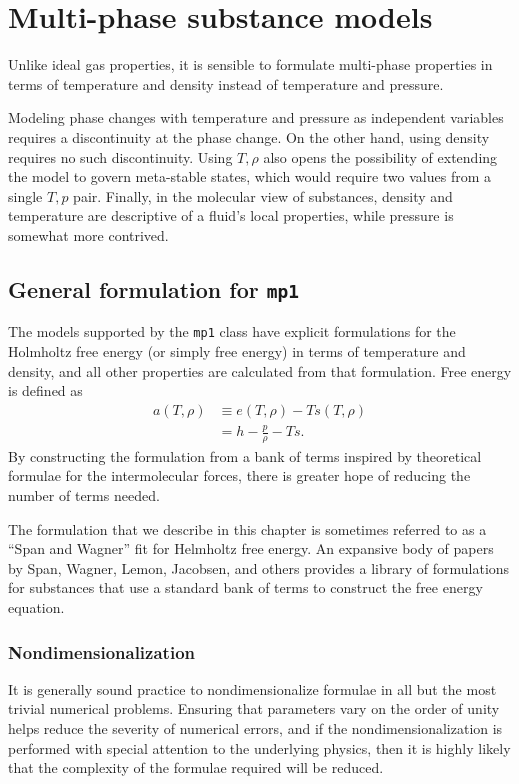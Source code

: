 \chapter{Multi-phase substance models}\label{ch:mp}

Unlike ideal gas properties, it is sensible to formulate multi-phase properties in terms of temperature and density instead of temperature and pressure.  

Modeling phase changes with temperature and pressure as independent variables requires a discontinuity at the phase change.  On the other hand, using density requires no such discontinuity.  Using $T,\rho$ also opens the possibility of extending the model to govern meta-stable states, which would require two values from a single $T,p$ pair.  Finally, in the molecular view of substances, density and temperature are descriptive of a fluid's local properties, while pressure is somewhat more contrived.

\section{General formulation for \texttt{mp1}}\label{sec:mp:mp1}

The models supported by the \texttt{mp1} class have explicit formulations for the Holmholtz free energy (or simply free energy) in terms of temperature and density, and all other properties are calculated from that formulation.  Free energy is defined as
\begin{align}
a(T,\rho) &\equiv e(T,\rho) - T s(T,\rho)\\
 &= h - \frac{p}{\rho} - T s.
\end{align}
By constructing the formulation from a bank of terms inspired by theoretical formulae for the intermolecular forces, there is greater hope of reducing the number of terms needed. 

The formulation that we describe in this chapter is sometimes referred to as a ``Span and Wagner'' fit for Helmholtz free energy.  An expansive body of papers by Span, Wagner, Lemon, Jacobsen, and others provides a library of formulations for substances that use a standard bank of terms to construct the free energy equation.

\subsection{Nondimensionalization}

It is generally sound practice to nondimensionalize formulae in all but the most trivial numerical problems.  Ensuring that parameters vary on the order of unity helps reduce the severity of numerical errors, and if the nondimensionalization is performed with special attention to the underlying physics, then it is highly likely that the complexity of the formulae required will be reduced.

